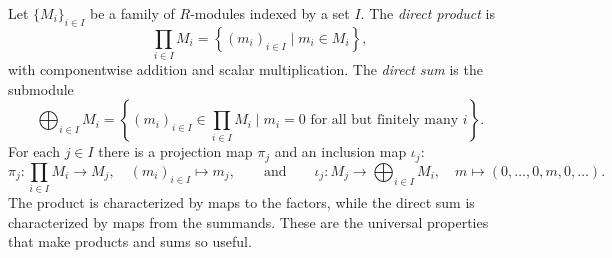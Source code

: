 \documentclass[12pt,reqno]{amsart}
\begin{document}
\hrulefill

Let $\{M_i\}_{i\in I}$ be a family of $R$-modules indexed by a set $I$. The \emph{direct product} is
\[
\prod_{i\in I}M_i=\left\{(m_i)_{i\in I}\mid m_i\in M_i\right\},
\]
with componentwise addition and scalar multiplication. The \emph{direct sum} is the submodule
\[
\bigoplus_{i\in I}M_i=\left\{(m_i)_{i\in I}\in \prod_{i\in I}M_i\mid m_i=0 \text{ for all but finitely many } i\right\}.
\]
For each $j \in I$ there is a projection map $\pi_j$ and an inclusion map $\iota_j$:
\[
\pi_j:\prod_{i\in I}M_i\to M_j,
\quad
(m_i)_{i\in I}\longmapsto m_j,
\quad \quad \text{and} \quad \quad 
\iota_j:M_j\to \bigoplus_{i\in I}M_i,
\quad
m\longmapsto (0,\ldots,0,m,0,\ldots).
\]
The product is characterized by maps to the factors, while the direct sum is characterized by maps from the summands. These are the universal properties that make products and sums so useful.

\hrulefill
\end{document}
